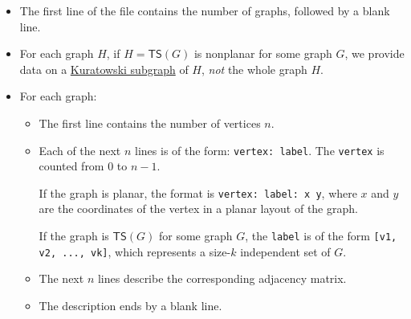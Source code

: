 \documentclass[a4paper]{article}
\theoremstyle{definition}
\theoremstyle{remark}
\numberwithin{equation}{section}
\begin{document}
\begin{itemize}
	\item The first line of the file contains the number of graphs, followed by a blank line.
	
	\item For each graph $H$, if $H = \mathsf{TS}(G)$ is nonplanar for some graph $G$, we provide data on a \href{https://en.wikipedia.org/wiki/Kuratowski's_theorem}{Kuratowski subgraph} of $H$, \textit{not} the whole graph $H$.
	
	\item For each graph:
	\begin{itemize}
		\item The first line contains the number of vertices $n$.
		
		\item Each of the next $n$ lines is of the form: \verb+vertex: label+. 
		The \verb+vertex+ is counted from $0$ to $n-1$.
		
		If the graph is planar, the format is \verb+vertex: label: x y+, where $x$ and $y$ are the coordinates of the vertex in a planar layout of the graph.
		
		If the graph is $\mathsf{TS}(G)$ for some graph $G$, the \verb+label+ is of the form \verb+[v1, v2, ..., vk]+, which represents a size-$k$ independent set of $G$.
		
		\item The next $n$ lines describe the corresponding adjacency matrix.
		
		\item The description ends by a blank line.
	\end{itemize}
\end{itemize}
\end{document}
